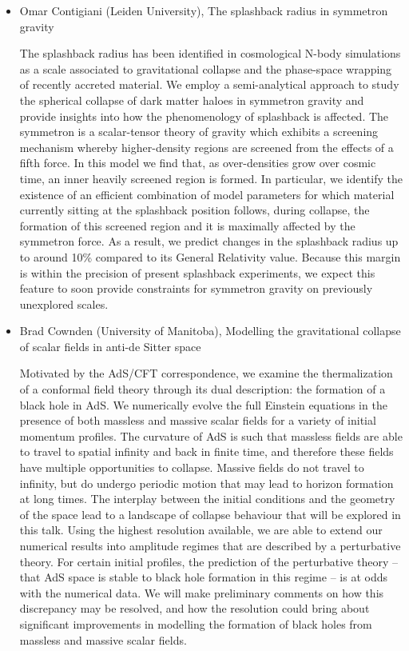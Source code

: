 \documentclass[letterpaper,12pt]{article}
\newcommand{\talk}[2]{{\fontspec{Lato Bold} #1,} {\fontspec{Lato Italic} #2}}
\begin{document}
\begin{itemize}
\item \talk{Omar Contigiani (Leiden University)}{The splashback radius in symmetron gravity}

The splashback radius has been identified in cosmological N-body simulations as a scale associated to gravitational collapse and the phase-space wrapping of recently accreted material.  We employ a semi-analytical approach to study the spherical collapse of dark matter haloes in symmetron gravity and provide insights into how the phenomenology of splashback is affected.  The symmetron is a scalar-tensor theory of gravity which exhibits a screening mechanism whereby higher-density regions are  screened  from  the  effects  of  a  fifth  force.  In  this  model  we  find that,  as  over-densities  grow  over cosmic  time,  an  inner  heavily  screened  region  is  formed.   In  particular,  we  identify  the  existence of an efficient combination of model parameters for which material currently sitting at the splashback position follows, during collapse, the formation of this screened region and it is maximally affected by the symmetron force.  As  a  result,  we  predict  changes  in the splashback  radius up  to around 10\% compared  to its General  Relativity value.  Because this margin is within the precision of present splashback experiments, we expect this feature to soon provide constraints for symmetron gravity on previously unexplored scales.


\item \talk{Brad Cownden (University of Manitoba)}{Modelling the gravitational collapse of scalar fields in anti-de Sitter space}

Motivated by the AdS/CFT correspondence, we examine the thermalization of a conformal field theory through its dual description: the formation of a black hole in AdS. We numerically evolve the full Einstein equations in the presence of both massless and massive scalar fields for a variety of initial momentum profiles. The curvature of AdS is such that massless fields are able to travel to spatial infinity and back in finite time, and therefore these fields have multiple opportunities to collapse. Massive fields do not travel to infinity, but do undergo periodic motion that may lead to horizon formation at long times. The interplay between the initial conditions and the geometry of the space lead to a landscape of collapse behaviour that will be explored in this talk. Using the highest resolution available, we are able to extend our numerical results into amplitude regimes that are described by a perturbative theory. For certain initial profiles, the prediction of the perturbative theory -- that AdS space is stable to black hole formation in this regime -- is at odds with the numerical data. We will make preliminary comments on how this discrepancy may be resolved, and how the resolution could bring about significant improvements in modelling the formation of black holes from massless and massive scalar fields.



\end{itemize}
\end{document}
